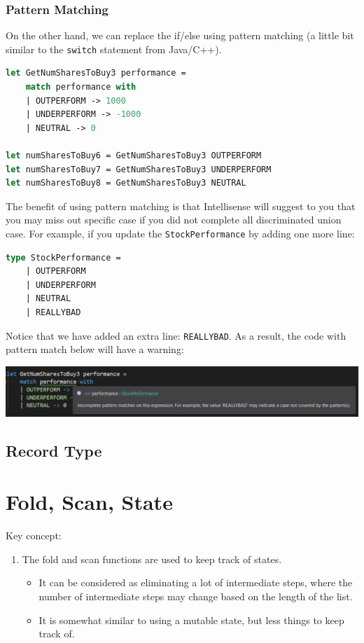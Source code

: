 \documentclass[12pt]{article}
\begin{document}
\subsubsection*{Pattern Matching}
On the other hand, we can replace the if/else using pattern matching (a little bit similar to the \texttt{switch} statement from Java/C++).
\begin{lstlisting}[language=FSharp]
let GetNumSharesToBuy3 performance =
    match performance with
    | OUTPERFORM -> 1000
    | UNDERPERFORM -> -1000
    | NEUTRAL -> 0

let numSharesToBuy6 = GetNumSharesToBuy3 OUTPERFORM
let numSharesToBuy7 = GetNumSharesToBuy3 UNDERPERFORM
let numSharesToBuy8 = GetNumSharesToBuy3 NEUTRAL
\end{lstlisting}

\pagebreak
The benefit of using pattern matching is that Intellisense will suggest to you that you may miss out specific case if you did not complete all discriminated union case. For example, if you update the \texttt{StockPerformance} by adding one more line:

\begin{lstlisting}[language=FSharp]
type StockPerformance = 
    | OUTPERFORM
    | UNDERPERFORM
    | NEUTRAL
    | REALLYBAD
\end{lstlisting}
Notice that we have added an extra line: \texttt{REALLYBAD}. As a result, the code with pattern match below will have a warning:
\begin{center}
\includegraphics[width=\textwidth]{pictures/picture30.png}
\end{center}
\subsection{Record Type}



\pagebreak
\section{Fold, Scan, State}
Key concept:
\begin{enumerate}
\item The fold and scan functions are used to keep track of states.
\begin{itemize}
\item It can be considered as eliminating a lot of intermediate steps, where the number of intermediate steps may change based on the length of the list.
\item It is somewhat similar to using a mutable state, but less things to keep track of.
\end{itemize}
\end{enumerate}
\end{document}
